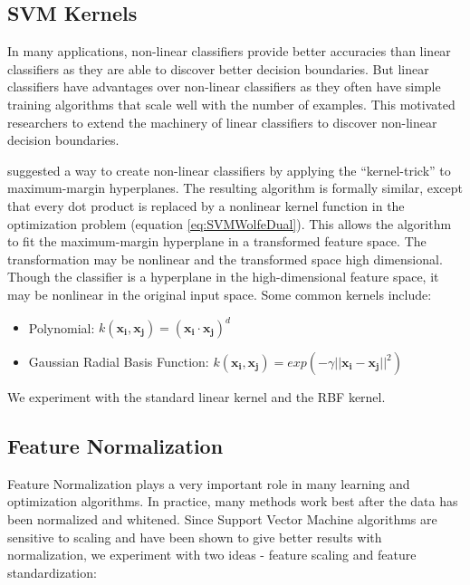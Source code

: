 \subsection{SVM Kernels}
In many applications, non-linear classifiers provide better accuracies than linear classifiers as they are able to discover better decision boundaries. But linear classifiers have advantages over non-linear classifiers as they often have simple training algorithms that scale well with the number of examples. This motivated researchers to extend the machinery of linear classifiers to discover non-linear decision boundaries.

\citep{VapnikSVMKernel:92} suggested a way to create non-linear classifiers by applying the ``kernel-trick'' to maximum-margin hyperplanes. The resulting algorithm is formally similar, except that every dot product is replaced by a nonlinear kernel function in the optimization problem (equation \ref{eq:SVMWolfeDual}). This allows the algorithm to fit the maximum-margin hyperplane in a transformed feature space. The transformation may be nonlinear and the transformed space high dimensional. Though the classifier is a hyperplane in the high-dimensional feature space, it may be nonlinear in the original input space.
Some common kernels include:
\begin{itemize}
\item Polynomial: $k(\bm{x_i},\bm{x_j}) = (\bm{x_i \cdot x_j})^d$
\item Gaussian Radial Basis Function: $k(\bm{x_i},\bm{x_j}) = exp(-\gamma||\bm{x_i - x_j}||^2)$
\end{itemize}
We experiment with the standard linear kernel and the RBF kernel.

\subsection{Feature Normalization}
Feature Normalization plays a very important role in many learning and optimization algorithms. In practice, many methods work best after the data has been normalized and whitened. Since Support Vector Machine algorithms are sensitive to scaling and have been shown to give better results with normalization, we experiment with two ideas - feature scaling and feature standardization:

